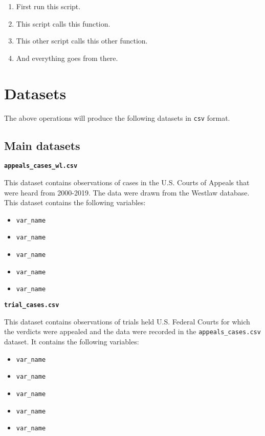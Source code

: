 \documentclass[11pt]{paper}
\begin{document}
\begin{enumerate}

\item First run this script. 

\item This script calls this function. 

\item This other script calls this other function. 

\item  And everything goes from there. 

\end{enumerate}


\section*{Datasets}


The above operations will produce the following datasets in \texttt{csv} format. 


\subsection*{Main datasets}

\noindent\textbf{\texttt{appeals\_cases\_wl.csv}}

This dataset contains observations of cases in the U.S. Courts of Appeals
that were heard from 2000-2019.  
The data were drawn from the Westlaw database. 
This dataset contains the following variables:

\begin{itemize}

\item \texttt{var\_name} 
\item \texttt{var\_name} 
\item \texttt{var\_name} 
\item \texttt{var\_name} 
\item \texttt{var\_name} 

\end{itemize}

\noindent\textbf{\texttt{trial\_cases.csv}}

This dataset contains observations of trials held
U.S. Federal Courts for which the verdicts were appealed
and the data were recorded in the \texttt{appeals\_cases.csv} dataset. 
It contains the following variables:

\begin{itemize}

\item \texttt{var\_name} 
\item \texttt{var\_name} 
\item \texttt{var\_name} 
\item \texttt{var\_name} 
\item \texttt{var\_name} 

\end{itemize}
\end{document}
